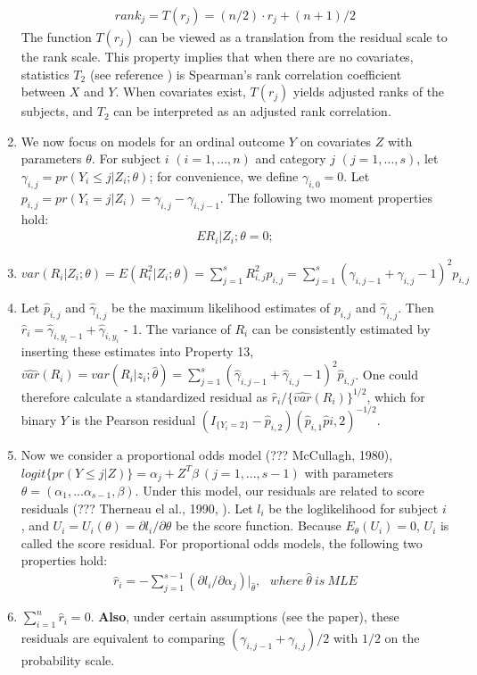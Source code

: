 \documentclass[]{article}
\begin{document}
\begin{enumerate}
	$$
	\begin{aligned}
		rank_j = T(r_j) = (n/2)\cdot r_j + (n+1)/2
	\end{aligned}
	$$
The function $T(r_j)$ can be viewed as a translation from the residual scale to the rank scale. This property implies that when there are no covariates, statistics $T_2$ (see reference \cite{li2010test}) is Spearman's rank correlation coefficient between $X$ and $Y$. When covariates exist, $T(r_j)$ yields adjusted ranks of the subjects, and $T_2$ can be interpreted as an adjusted rank correlation.
	\item We now focus on models for an ordinal outcome $Y$ on covariates $Z$ with parameters $\theta$. For subject $i$ $(i=1,...,n)$ and category $j$ $(j=1,...,s)$, let $\gamma_{i,j} = pr(Y_i\leq j|Z_i;\theta)$; for convenience, we define $\gamma_{i,0} = 0$. Let $p_{i,j} = pr(Y_i=j|Z_i)=\gamma_{i,j} - \gamma_{i, j-1}$. The following two moment properties hold:
	$$
	\begin{aligned}
		E{R_i|Z_i;\theta} = 0;
	\end{aligned}
	$$
	\item $var(R_i|Z_i;\theta) = E(R_i^2|Z_i;\theta) =\sum_{j=1}^s R_{i,j}^2 p_{i,j}= \sum_{j=1}^s (\gamma_{i,j-1} + \gamma_{i,j} - 1)^2 p_{i,j}$
	
	\item Let $\hat{p}_{i,j}$ and $\hat{\gamma}_{i,j}$ be the maximum likelihood estimates of $p_{i,j}$ and $\hat{\gamma}_{i,j}$. Then $\hat{r}_i = \hat{\gamma}_{i, y_i-1} + \hat{\gamma}_{i, y_i}$ - 1. The variance of $R_i$ can be consistently estimated by inserting these estimates into Property 13, $\hat{var}(R_i) = var(R_i|z_i;\hat{\theta}) =  \sum_{j=1}^s (\hat{\gamma}_{i,j-1} + \hat{\gamma}_{i,j} - 1)^2 \hat{p}_{i,j}$. One could therefore calculate a standardized residual as $\hat{r}_i/\{\hat{var}(R_i)\}^{1/2}$, which for binary $Y$ is the Pearson residual $(I_{\{Y_i=2\}} - \hat{p}_{i,2})(\hat{p}_{i,1}\hat{p}{i,2})^{-1/2}$.
	
	\item Now we consider a proportional odds model (??? McCullagh, 1980), $logit\{pr(Y \leq j|Z)\}=\alpha_j + Z^T\beta~(j=1,...,s-1)$ with parameters $\theta = (\alpha_1, ...\alpha_{s-1}, \beta)$. Under this model, our residuals are related to score residuals (??? Therneau el al., 1990, ). Let $l_i$ be the loglikelihood for subject $i$, and $U_i=U_i(\theta) = \partial l_i/\partial \theta$ be the score function. Because $E_{\theta}(U_i) = 0$, $U_i$ is called the score residual. For proportional odds models, the following two properties hold:
	$$
	\begin{aligned}
		\hat{r}_i = - \sum_{j=1}^{s-1}(\partial l_i/\partial \alpha_j)|_{\hat{\theta}}, ~~~where ~\hat{\theta}~is~MLE
	\end{aligned}
	$$
	\item $\sum_{i=1}^n \hat{r}_i = 0$.
\textbf{Also}, under certain assumptions (see the paper), these residuals are equivalent to comparing $(\gamma_{i,j-1} + \gamma_{i,j})/2$ with $1/2$ on the probability scale.
	
\end{enumerate}
~\\
\end{document}
